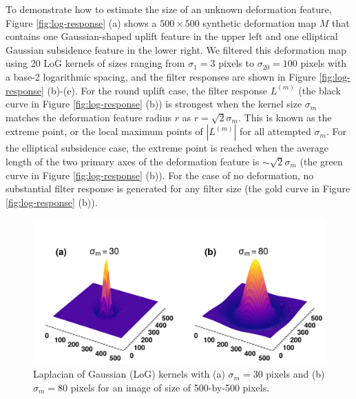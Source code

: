 \documentclass{utexasthesis}
\begin{document}
To demonstrate how to estimate the size of an unknown deformation feature, Figure \ref{fig:log-response} (a) shows a $500 \times 500$ synthetic deformation map $M$ that contains one Gaussian-shaped uplift feature in the upper left and one elliptical Gaussian subsidence feature in the lower right. We filtered this deformation map using 20 LoG kernels of sizes ranging from $\sigma_1 = 3$ pixels to $\sigma_{20} = 100$ pixels with a base-2 logarithmic spacing, and the filter responses are shown in Figure \ref{fig:log-response} (b)-(e). For the round uplift case, the filter response $L^{(m)}$ (the black curve in Figure \ref{fig:log-response} (b)) is strongest when the kernel size $\sigma_m$ matches the deformation feature radius $r$ as $r = \sqrt{2}\sigma_m$. This is known as the extreme point, or the local maximum points of $|L^{(m)}|$ for all attempted $\sigma_m$. For the elliptical subsidence case, the extreme point is reached when the average length of the two primary axes of the deformation feature is $\sim \sqrt{2}\sigma_m$ (the green curve in Figure \ref{fig:log-response} (b)). For the case of no deformation, no substantial filter response is generated for any filter size (the gold curve in Figure \ref{fig:log-response} (b)).

\begin{figure}[hbt!]
\centering
 \includegraphics[width=0.98\linewidth]{paper2/figures/figure1_log_examples.pdf}
\caption{
Laplacian of Gaussian (LoG) kernels with (a) $\sigma_m=30$ pixels and (b) $\sigma_m=80$ pixels for an image of size of 500-by-500 pixels.
}
\label{fig:log-kernel}
%
\end{figure}
\end{document}
